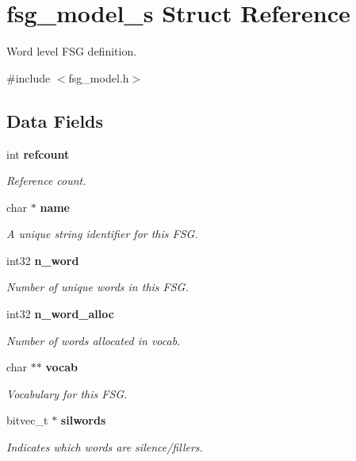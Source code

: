 \section{fsg\+\_\+model\+\_\+s Struct Reference}
\label{structfsg__model__s}


Word level F\+SG definition.  




{\ttfamily \#include $<$fsg\+\_\+model.\+h$>$}

\subsection*{Data Fields}
\begin{DoxyCompactItemize}
\item 
int \textbf{ refcount}
\begin{DoxyCompactList}\small\item\em Reference count. \end{DoxyCompactList}\item 
\mbox{\label{structfsg__model__s_ab23ae2c362f1a3b18bbe135b97dfb467}} 
char $\ast$ \textbf{ name}
\begin{DoxyCompactList}\small\item\em A unique string identifier for this F\+SG. \end{DoxyCompactList}\item 
\mbox{\label{structfsg__model__s_a99ed2894f7690a960d11e1590d11a6b9}} 
int32 \textbf{ n\+\_\+word}
\begin{DoxyCompactList}\small\item\em Number of unique words in this F\+SG. \end{DoxyCompactList}\item 
\mbox{\label{structfsg__model__s_a329ae88c26111df8cd64657b46b9108f}} 
int32 \textbf{ n\+\_\+word\+\_\+alloc}
\begin{DoxyCompactList}\small\item\em Number of words allocated in vocab. \end{DoxyCompactList}\item 
char $\ast$$\ast$ \textbf{ vocab}
\begin{DoxyCompactList}\small\item\em Vocabulary for this F\+SG. \end{DoxyCompactList}\item 
bitvec\+\_\+t $\ast$ \textbf{ silwords}
\begin{DoxyCompactList}\small\item\em Indicates which words are silence/fillers. \end{DoxyCompactList}\item 
$$
\end{DoxyCompactItemize}
